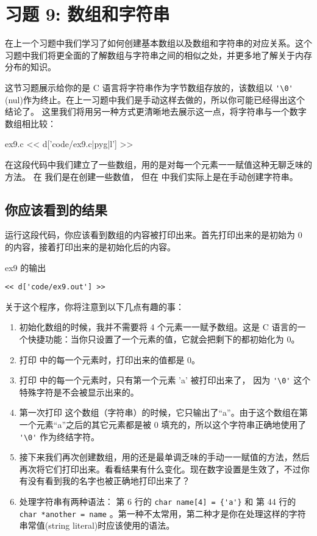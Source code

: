 \chapter{习题 9: 数组和字符串}

在上一个习题中我们学习了如何创建基本数组以及数组和字符串的对应关系。这个习题中我们将更全面的了解数组与字符串之间的相似之处，并更多地了解关于内存分布的知识。

这节习题展示给你的是 C 语言将字符串作为字节数组存放的，该数组以 \verb|'\0'| (nul)作为终止。在上一习题中我们是手动这样去做的，所以你可能已经得出这个结论了。 这里我们将用另一种方式更清晰地去展示这一点，将字符串与一个数字数组相比较：

\begin{code}{ex9.c}
<< d['code/ex9.c|pyg|l'] >>
\end{code}

在这段代码中我们建立了一些数组，用的是对每一个元素一一赋值这种无聊乏味的方法。 在  我们是在创建一些数值， 但在  中我们实际上是在手动创建字符串。


\section{你应该看到的结果}

运行这段代码，你应该看到数组的内容被打印出来。首先打印出来的是初始为 0 的内容，接着打印出来的是初始化后的内容。

\begin{code}{ex9 的输出}
\begin{lstlisting}
<< d['code/ex9.out'] >>
\end{lstlisting}
\end{code}

关于这个程序，你将注意到以下几点有趣的事：

\begin{enumerate}
\item 初始化数组的时候，我并不需要将 4 个元素一一赋予数组。这是 C 语言的一个快捷功能：当你只设置了一个元素的值，它就会把剩下的都初始化为 0。
\item 打印  中的每一个元素时，打印出来的值都是 0。
\item 打印  中的每一个元素时，只有第一个元素 'a' 被打印出来了， 因为 \verb|'\0'| 这个特殊字符是不会被显示出来的。 
\item 第一次打印  这个数组（字符串）的时候，它只输出了“a”。由于这个数组在第一个元素“a”之后的其它元素都是被 0 填充的，所以这个字符串正确地使用了 \verb|'\0'| 作为终结字符。
\item 接下来我们再次创建数组，用的还是最单调乏味的手动一一赋值的方法，然后再次将它们打印出来。看看结果有什么变化。现在数字设置是生效了，不过你有没有看到我的名字也被正确地打印出来了？
\item 处理字符串有两种语法： 第 6 行的 \verb|char name[4] = {'a'}| 和 第 44 行的 \verb|char *another = name| 。第一种不太常用，第二种才是你在处理这样的字符串常值(string literal)时应该使用的语法。
\end{enumerate}


